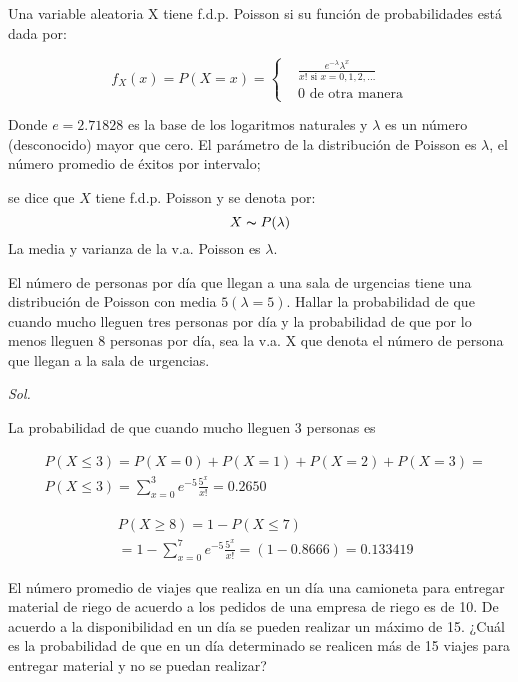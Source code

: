 Una variable aleatoria X tiene f.d.p. Poisson si su
función de probabilidades está dada por:

\begin{equation}
    f_X( x )=P(X=x )=\begin{cases}
         & \frac{e^{-\lambda}\lambda^x}{x!\text{ si }x=0,1,2,\dots} \\
         & 0 \text{ de otra manera}
    \end{cases}
\end{equation}

Donde $e=2.71828$ es la base de los logaritmos naturales
y $\lambda$ es un número (desconocido) mayor que cero.
El parámetro de la distribución de Poisson es $\lambda$, el
número promedio de éxitos por intervalo;
\begin{notation}
    se dice que $X$ tiene f.d.p. Poisson y se denota por:
    \begin{equation}
        X\thicksim P(\lambda )
    \end{equation}
    La media y varianza de la v.a. Poisson es $\lambda$.
\end{notation}

\begin{example}
    El número de personas por día que llegan a una
    sala de urgencias tiene una distribución de
    Poisson con media $5 (\lambda=5)$.
    Hallar la probabilidad de que cuando mucho
    lleguen tres personas por día y la probabilidad
    de que por lo menos lleguen 8 personas por día,
    sea la v.a. X que denota el número de persona
    que llegan a la sala de urgencias.
\end{example}

\textit{ Sol.}

La probabilidad de que cuando mucho
lleguen 3 personas es

\begin{align*}
     & P(X\leq 3)=P(X=0)+P(X=1)+P(X=2)+P(X=3)=             \\
     & P(X\leq 3)=\sum_{x=0}^3 e^{-5}\frac{5^x}{x!}=0.2650
\end{align*}

\begin{align*}
     & P(X\geq 8)=1-P(X\leq 7)                                 \\
     & =1-\sum_{x=0}^7e^{-5}\frac{5^x}{x!}=(1-0.8666)=0.133419
\end{align*}

\begin{example}
    El número promedio de viajes que
    realiza en un día una camioneta para
    entregar material de riego de acuerdo a
    los pedidos de una empresa de riego es
    de 10. De acuerdo a la disponibilidad en
    un día se pueden realizar un máximo de
    15. ¿Cuál es la probabilidad de que en
    un día determinado se realicen más de
    15 viajes para entregar material y no se
    puedan realizar?
\end{example}

